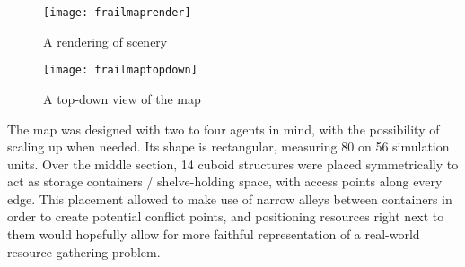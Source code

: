\begin{figure}[h]
    \centering
    \texttt{[image: frailmaprender]}
    \caption{A rendering of scenery}
    \label{fig:x simmaprender}
\end{figure}

\begin{figure}[h]
    \centering
    \texttt{[image: frailmaptopdown]}
    \caption{A top-down view of the map}
    \label{fig:x simmaptopdown}
\end{figure}

The map was designed with two to four agents in mind, with the possibility of scaling up when needed. Its shape is rectangular, measuring 80 on 56 simulation units. Over the middle section, 14 cuboid structures were placed symmetrically to act as storage containers / shelve-holding space, with access points along every edge. This placement allowed to make use of narrow alleys between containers in order to create potential conflict points, and positioning resources right next to them would hopefully allow for more faithful representation of a real-world resource gathering problem.
